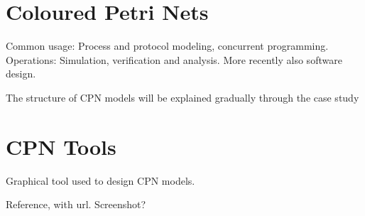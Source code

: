 \section{Coloured Petri Nets}

Common usage: Process and protocol modeling, concurrent programming. Operations:
Simulation, verification and analysis. More recently also software design.

The structure of CPN models will be explained gradually through the case study 

\section{CPN Tools}

Graphical tool used to design CPN models. 

Reference, with url. Screenshot?
\begin{comment}

\subsection{CPN ML}
	


		
		The simple types available are unit, boolean, integer, string, enumerated
		and index. A unit can have one value: \lstinline:():. Enumerated colour sets
		can have specified values, while index colour sets define an indexed range of
		values. 
		
		The compound types are:
		\begin{description}
		\item[Product] A combination of colour sets separated by \lstinline:*:. The
		postal code and city example from earlier would be
		\lstinline:product INT*STRING:, and a colour would be (5055,''Bergen'');
		\item[List] A list of items that belong to the same colour set.
		\item[Record] Similar to a product, but each element is named. The postal code
		and city example would give \lstinline-record Code:INT*City:STRING- and a
		colour would be \lstinline:{Code=5055,City="Bergen"}:
		\item[Union] This is used if a place should be able to contain colours from
		different colour sets, or if such colours should be handled in the same way at a
		point in the model. They can also contain simple identifiers, like an
		enumeration. An example is shown in Listing \ref{lst:overview_colset}.
		\end{description}
		
		For full syntax definition, please refer to the CPN Tools
		documentation. (ref?)

\end{comment}
